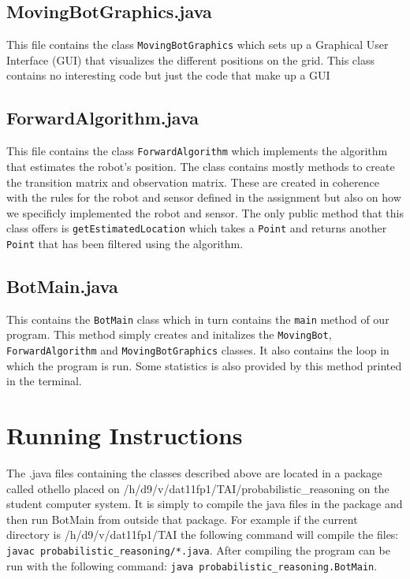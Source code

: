 \documentclass[a4paper]{article}
\begin{document}
\subsection{MovingBotGraphics.java}
This file contains the class \texttt{MovingBotGraphics} which sets up a Graphical User Interface (GUI) that visualizes the different positions on the grid. This class contains no interesting code but just the code that make up a GUI
\subsection{ForwardAlgorithm.java} This file contains the class \texttt{ForwardAlgorithm} which implements the algorithm that estimates the robot's position. The class contains mostly methods to create the transition matrix and observation matrix. These are created in coherence with the rules for the robot and sensor defined in the assignment but also on how we specificly implemented the robot and sensor. The only public method that this class offers is \texttt{getEstimatedLocation} which takes a \texttt{Point} and returns another \texttt{Point} that has been filtered using the algorithm.
\subsection{BotMain.java} This contains the \texttt{BotMain} class which in turn contains the \texttt{main} method of our program. This method simply creates and initalizes the \texttt{MovingBot}, \texttt{ForwardAlgorithm} and \texttt{MovingBotGraphics} classes. It also contains the loop in which the program is run. Some statistics is also provided by this method printed in the terminal.

\section{Running Instructions} The .java files containing the classes described
above are located in a package called othello placed on
/h/d9/v/dat11fp1/TAI/probabilistic\_reasoning on the student computer system. It
is simply to compile the java files in the package and then run BotMain from
outside that package. For example if the current directory is
/h/d9/v/dat11fp1/TAI the following command will compile the files: \texttt{javac
probabilistic\_reasoning/*.java}. After compiling the program can be run with
the following command: \texttt{java probabilistic\_reasoning.BotMain}.

\end{document}
